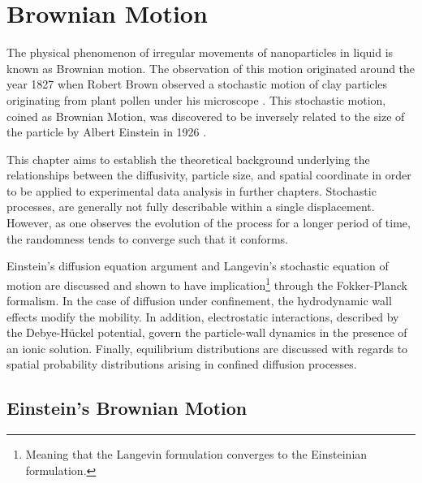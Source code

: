 \chapter{Brownian Motion}
\label{chap:brownianmotion}


The physical phenomenon of irregular movements of nanoparticles in liquid is known as Brownian motion. The observation of this motion originated around the year 1827 when Robert Brown observed a stochastic motion of clay particles originating from plant pollen under his microscope \cite{brownXXVIIBriefAccount1828}. This stochastic motion, coined as Brownian Motion, was discovered to be inversely related to the size of the particle by Albert Einstein in 1926 \cite{einstein1956investigations}.


This chapter aims to establish the theoretical background underlying the relationships between the diffusivity, particle size, and spatial coordinate in order to be applied to experimental data analysis in further chapters. Stochastic processes, are generally not fully describable within a single displacement. However, as one observes the evolution of the process for a longer period of time, the randomness tends to converge such that it conforms. 

Einstein's diffusion equation argument and Langevin's stochastic equation of motion are discussed and shown to have implication\footnote{Meaning that the Langevin formulation converges to the Einsteinian formulation.} through the Fokker-Planck formalism. In the case of diffusion under confinement, the hydrodynamic wall effects modify the mobility. In addition, electrostatic interactions, described by the Debye-Hückel potential, govern the particle-wall dynamics in the presence of an ionic solution. Finally, equilibrium distributions are discussed with regards to  spatial probability distributions arising in confined diffusion processes. 

\clearpage
\section{Einstein's Brownian Motion}

